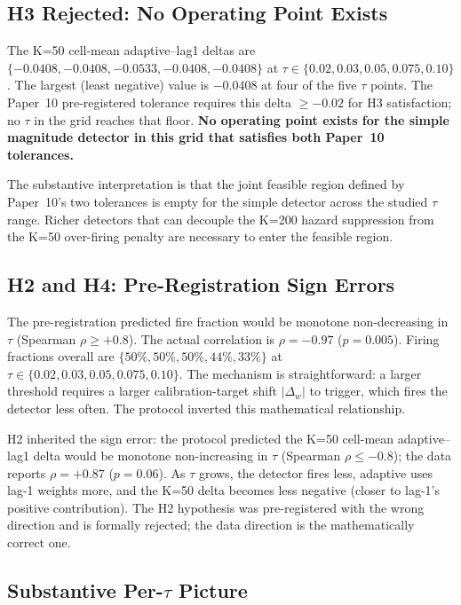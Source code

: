 \subsection{H3 Rejected: No Operating Point Exists}

The K=50 cell-mean adaptive--lag1 deltas are
$\{-0.0408, -0.0408, -0.0533, -0.0408, -0.0408\}$ at
$\tau \in \{0.02, 0.03, 0.05, 0.075, 0.10\}$. The largest (least
negative) value is $-0.0408$ at four of the five $\tau$ points.
The Paper~10 pre-registered tolerance requires this delta $\geq
-0.02$ for H3 satisfaction; no $\tau$ in the grid reaches that
floor. \textbf{No operating point exists for the simple magnitude
detector in this grid that satisfies both Paper~10 tolerances.}

The substantive interpretation is that the joint feasible region
defined by Paper~10's two tolerances is empty for the simple
detector across the studied $\tau$ range. Richer detectors that
can decouple the K=200 hazard suppression from the K=50 over-firing
penalty are necessary to enter the feasible region.

\subsection{H2 and H4: Pre-Registration Sign Errors}

The pre-registration predicted fire fraction would be monotone
non-decreasing in $\tau$ (Spearman $\rho \geq +0.8$). The actual
correlation is $\rho = -0.97$ ($p = 0.005$). Firing fractions
overall are $\{50\%, 50\%, 50\%, 44\%, 33\%\}$ at $\tau \in
\{0.02, 0.03, 0.05, 0.075, 0.10\}$. The mechanism is straightforward:
a larger threshold requires a larger calibration-target shift
$|\Delta_w|$ to trigger, which fires the detector less often. The
protocol inverted this mathematical relationship.

H2 inherited the sign error: the protocol predicted the K=50 cell-mean
adaptive--lag1 delta would be monotone non-increasing in $\tau$
(Spearman $\rho \leq -0.8$); the data reports
$\rho = +0.87$ ($p = 0.06$). As $\tau$ grows, the detector fires
less, adaptive uses lag-1 weights more, and the K=50 delta becomes
less negative (closer to lag-1's positive contribution). The H2
hypothesis was pre-registered with the wrong direction and is
formally rejected; the data direction is the mathematically correct
one.



\subsection{Substantive Per-$\tau$ Picture}

